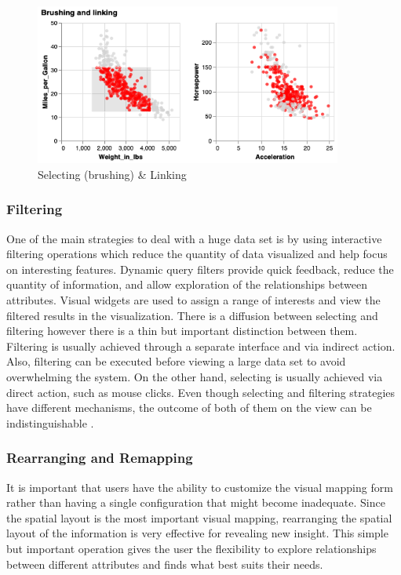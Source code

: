 \begin{figure}[H]
\centering
\captionsetup{justification=centering}
\includegraphics[width=0.9\textwidth]{./pics/brlink2}
\caption{Selecting (brushing) \& Linking \cite{brushlink}}
\label{fig:BrushingANDLinking}
\end{figure}


\subsubsection{Filtering}

One of the main strategies to deal with a huge data set is by using interactive filtering operations which reduce the quantity of data visualized and help focus on interesting features. Dynamic query filters provide quick feedback, reduce the quantity of information, and allow exploration of the relationships between attributes. Visual widgets are used to assign a range of interests and view the filtered results in the visualization. There is a diffusion between selecting and filtering however there is a thin but important distinction between them. Filtering is usually achieved through a separate interface and via indirect action. Also, filtering can be executed before viewing a large data set to avoid overwhelming the system. On the other hand, selecting is usually achieved via direct action, such as mouse clicks. Even though selecting and filtering strategies have different mechanisms, the outcome of both of them on the view can be indistinguishable \cite{ward2015interactive}.

\subsubsection{Rearranging and Remapping}

It is important that users have the ability to customize the visual mapping form rather than having a single configuration that might become inadequate. Since the spatial layout is the most important visual mapping, rearranging the spatial layout of the information is very effective for revealing new insight. This simple but important operation gives the user the flexibility to explore relationships between different attributes and finds what best suits their needs.


